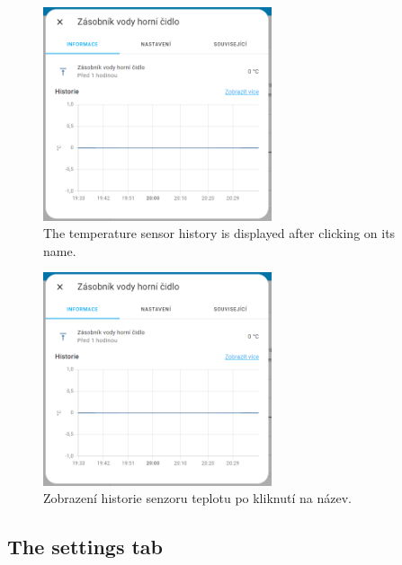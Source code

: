 \begin{English}
\begin{figure}[H]
    \centering
    \includegraphics[width=0.6\textwidth]{pictures/czech/software/click-temperature-sensor.png}
    \caption{The temperature sensor history is displayed after clicking on its name.}
    \label{fig:click-temperature-sensor}
\end{figure}
\end{English}

\begin{Czech}
\begin{figure}[H]
    \centering
    \includegraphics[width=0.6\textwidth]{pictures/czech/software/click-temperature-sensor.png}
    \caption{Zobrazení historie senzoru teplotu po kliknutí na název.}
    \label{fig:click-temperature-sensor}
\end{figure}
\end{Czech}

\begin{English}
\subsection{The settings tab}
\end{English}

